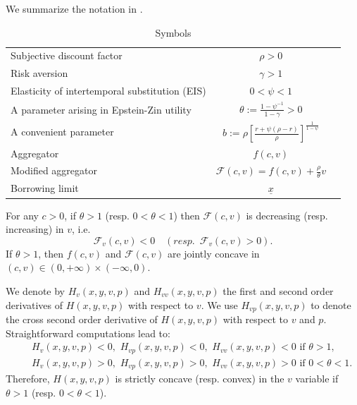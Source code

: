 \documentclass[11pt]{article}
\numberwithin{equation}{section}
\numberwithin{algorithm}{section}
\newcommand{\ux}{{\underline x}}
\newcommand{\beq}{\begin{equation}}
\newcommand{\eeq}{\end{equation}}
\newcommand{\g}{\gamma}
\newcommand{\p}{\psi}
\theoremstyle{plain}
\begin{document}
We summarize the notation in . 
\begin{table}[!h]
    \centering
    \caption{Symbols}
    \label{tab1}
    \begin{tabular}{l c c}
        \hline
        Subjective discount factor & $\rho>0$ \\
        Risk aversion  & $\gamma>1$  \\
        Elasticity of intertemporal substitution (EIS) &$0<\psi<1$\\
        A parameter arising in Epstein-Zin utility &$\theta:=\frac{1-\p^{-1}}{1-\g}>0$\\
        A convenient parameter &$b:= \rho\left[\frac{r+\p(\rho-r)}{\rho}\right]^{\frac{1}{1-\p}}$\\
        Aggregator & $f(c,v)$\\
        Modified aggregator & $ \mathcal{F}(c,v)=f(c,v)+\frac{\rho}{\theta}v$\\
        Borrowing limit & $\ux$ \\
       \hline
    \end{tabular}
\end{table}\par
For any $c>0$, if $\theta > 1$ (resp. $0<\theta<1$) then $\mathcal{F}(c,v)$ is decreasing (resp. increasing) in $v$, i.e. 
\beq\label{F monotone}
\mathcal{F}_v(c,v)< 0\quad (resp. \,\,\,\mathcal{F}_v(c,v)>0).
\eeq
If $\theta > 1$, then $f(c,v)$ and $\mathcal{F}(c,v)$ are jointly concave in $(c,v)\in (0,+\infty)\times (-\infty,0)$.\par
We denote by $H_v(x,y,v,p)$ and $H_{vv}(x,y,v,p)$ the first and second order derivatives of $H(x,y,v,p)$ with respect to $v$. We use $H_{vp}(x,y,v,p)$ to denote the cross second order derivative of $H(x,y,v,p)$ with respect to $v$ and $p$.  Straightforward computations lead to:
\beq\label{Eq:Hv>0}
\begin{aligned}
\quad &H_v(x,y,v,p)<0,\,\,  H_{vp}(x,y,v,p)< 0,\,\,  H_{vv}(x,y,v,p)< 0\,\, {\text{if}}\,\,\theta > 1,\\
&H_v(x,y,v,p)> 0,\,\,  H_{vp}(x,y,v,p)>0,\,\,  H_{vv}(x,y,v,p)>0\,\, {\text{if}}\,\,0<\theta<1.
\end{aligned}
\eeq
Therefore, $H(x,y,v,p)$ is strictly concave (resp. convex) in the $v$ variable if $\theta > 1$ (resp. $0<\theta<1$). \par
\end{document}
